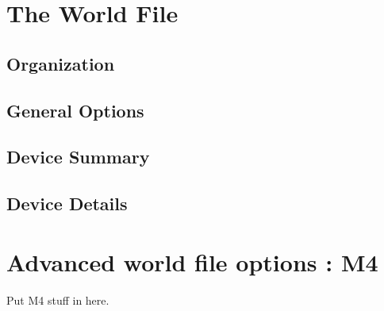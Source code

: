 \documentclass[11pt]{report}
\begin{document}
\chapter{The World File}
  
  \section{Organization}

  \section{General Options}

  \section{Device Summary}

  \section{Device Details}

\appendix

\chapter{Advanced world file options : M4}

  Put M4 stuff in here.
\end{document}
